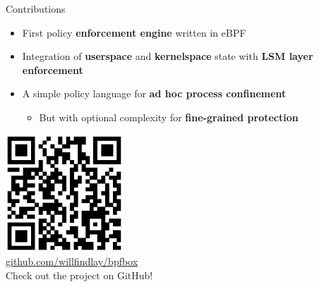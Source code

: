\documentclass[12pt, dvipsnames]{beamer}
\begin{document}
\begin{frame}[c]{Contributions}
\begin{itemize}
    \item First policy \textbf{enforcement engine} written in eBPF
    \item Integration of \textbf{userspace} and \textbf{kernelspace} state with \textbf{LSM layer enforcement}
    \item A simple policy language for \textbf{ad hoc process confinement}
    \begin{itemize}
        \item But with optional complexity for \textbf{fine-grained protection}
    \end{itemize}
\end{itemize}
\begin{center}
    \includegraphics[width=0.33\textwidth]{figs/bpfbox-qrcode.eps}\\
    \href{https://github.com/willfindlay/bpfbox}{\ttfamily github.com/willfindlay/bpfbox}\\
    Check out the project on GitHub!
\end{center}
\end{frame}
\end{document}
